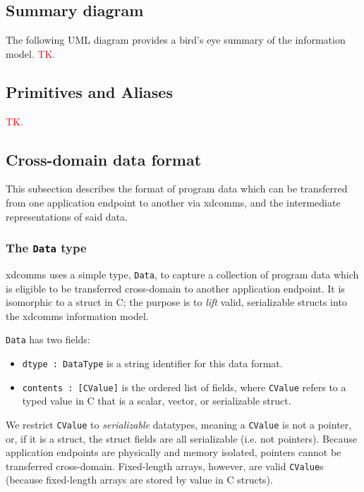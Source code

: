 \documentclass[11pt, oneside]{article}
\newcommand{\todo}{\textcolor{red}{TK.}}
\begin{document}
        \subsection{Summary diagram}

            The following UML diagram provides a bird's eye summary of the
            information model. \todo

        \subsection{Primitives and Aliases}

            \todo

        \subsection{Cross-domain data format}

            This subsection describes the format of program data which can be 
            transferred from one application endpoint to another via xdcomms, and
            the intermediate representations of said data.

            \subsubsection{The \texttt{Data} type}

                xdcomms uses a simple type, \texttt{Data}, to capture a collection
                of program data which is eligible to be transferred cross-domain 
                to another application endpoint. It is isomorphic to a struct in C;
                the purpose is to \textit{lift} valid, serializable structs into
                the xdcomms information model.

                \texttt{Data} has two fields:
                \begin{itemize}
                    \item \texttt{dtype : DataType} is a string identifier for this data format.
                    \item \texttt{contents : [CValue]} is the ordered list of fields, where 
                    \texttt{CValue} refers to a typed value in C that is a scalar, vector,
                    or serializable struct.
                \end{itemize}

                We restrict \texttt{CValue} to \textit{serializable} datatypes, meaning a \texttt{CValue} is not a
                pointer, or, if it is a struct, the struct fields are all serializable (i.e.
                not pointers). Because application endpoints are physically and memory 
                isolated, pointers cannot be transferred cross-domain. Fixed-length arrays,
                however, are valid \texttt{CValue}s (because fixed-length arrays are stored by value
                in C structs).
\end{document}
